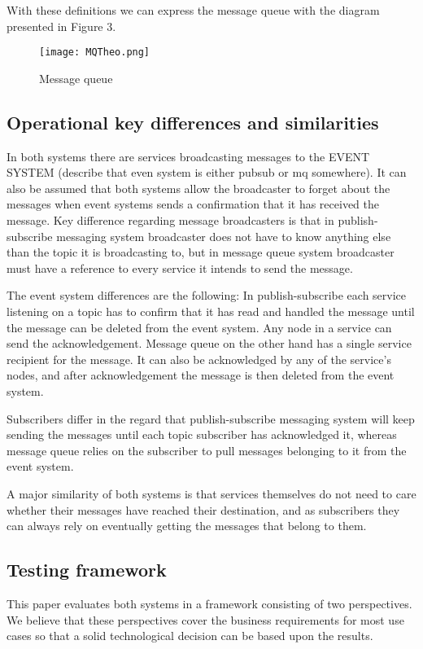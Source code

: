 \documentclass[conference]{IEEEtran}
\begin{document}
With these definitions we can express the message queue with the diagram presented in Figure 3.
\begin{figure}
    \centering
    \texttt{[image: MQTheo.png]}
    \caption{Message queue}
\end{figure}



\subsection{Operational key differences and similarities}
In both systems there are services broadcasting messages to the EVENT SYSTEM (describe that even system is either pubsub or mq somewhere). It can also be assumed that both systems allow the broadcaster to forget about the messages when event systems sends a confirmation that it has received the message. Key difference regarding message broadcasters is that in publish-subscribe messaging system broadcaster does not have to know anything else than the topic it is broadcasting to, but in message queue system broadcaster must have a reference to every service it intends to send the message.

The event system differences are the following: In publish-subscribe each service listening on a topic has to confirm that it has read and handled the message until the message can be deleted from the event system. Any node in a service can send the acknowledgement. Message queue on the other hand has a single service recipient for the message. It can also be acknowledged by any of the service’s nodes, and after acknowledgement the message is then deleted from the event system.

Subscribers differ in the regard that publish-subscribe messaging system will keep sending the messages until each topic subscriber has acknowledged it, whereas message queue relies on the subscriber to pull messages belonging to it from the event system.

A major similarity of both systems is that services themselves do not need to care whether their messages have reached their destination, and as subscribers they can always rely on eventually getting the messages that belong to them.

\subsection{Testing framework}
This paper evaluates both systems in a framework consisting of two perspectives. We believe that these perspectives cover the business requirements for most use cases so that a solid technological decision can be based upon the results.
\end{document}
